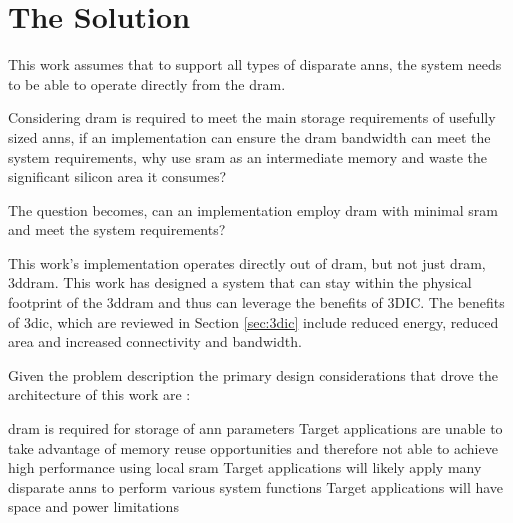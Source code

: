 
\section[The Solution]{The Solution}
\label{sec:The Solution}

This work assumes that to support all types of disparate \ac{ann}s, the system needs to be able to operate directly from the \ac{dram}.
\iffalse 
This is because SRAM-based solutions assume memory reuse when processing a \ac{ann}.
However, when \ac{ann}s do not provide sufficient reuse these solutions become \ac{dram} bandwidth bound. 
\fi

Considering \ac{dram} is required to meet the main storage requirements of usefully sized \ac{ann}s, if an implementation can ensure the \ac{dram} bandwidth can meet the system requirements, why use \ac{sram} as an intermediate memory and waste the significant silicon area it consumes?

The question becomes, can an implementation employ \ac{dram} with minimal \ac{sram} and meet the system requirements?

This work's implementation operates directly out of \ac{dram}, but not just \ac{dram}, \ac{3ddram}.
This work has designed a system that can stay within the physical footprint of the \ac{3ddram} and thus can leverage the benefits of 3DIC.
The benefits of \ac{3dic}, which are reviewed in Section \ref{sec:3dic} include reduced energy, reduced area and increased connectivity and bandwidth.

\iffalse
Therefore, this work is able to propose a custom 3D-\ac{dram} that exposes more of the \ac{dram}s internal page and thus generates interface bandwidth that is on the order of 64 times that of the standard \ac{3ddram}.
\fi

Given the problem description \iffalse outlined in Section \ref{sec:The Problem},\fi the primary design considerations that drove the architecture of this work are :
\begin{outline}
  \1 \ac{dram} is required for storage of \ac{ann} parameters 
  \1 Target applications are unable to take advantage of memory reuse opportunities and therefore not able to achieve high performance using local \ac{sram} \iffalse to store \ac{ann} parameters or the \ac{ann} input \fi
  \1 Target applications will likely apply many disparate \acp{ann} to perform various system functions
  \1 Target applications will have space and power limitations
\end{outline}

